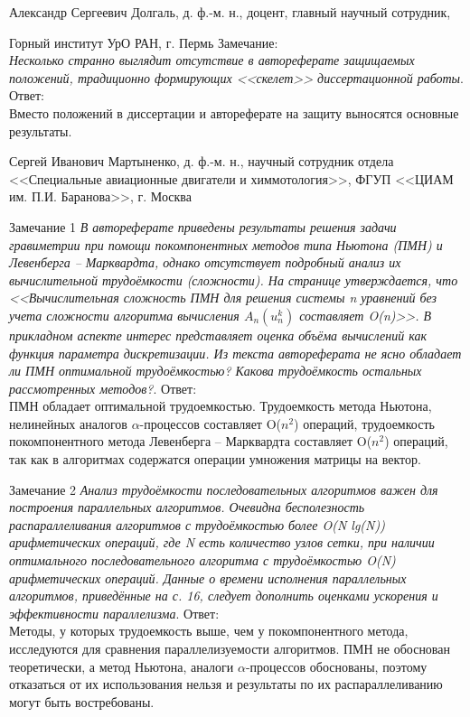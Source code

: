 \documentclass[10pt,pdf, mathserif, hyperref={unicode}]{beamer}
\begin{document}
\begin{frame}
	Александр Сергеевич Долгаль, д. ф.-м. н., доцент, главный научный сотрудник,
	
	\vskip 5mm
	Горный институт УрО РАН, г. Пермь
	\vskip 5mm
	Замечание:\\
	\textit{Несколько странно выглядит отсутствие в автореферате защищаемых положений, традиционно формирующих <<скелет>> диссертационной работы}.
	\vskip 5mm
	Ответ:\\
	Вместо положений в диссертации и автореферате на защиту выносятся основные результаты.
\end{frame}

\begin{frame}
	Сергей Иванович Мартыненко,  д. ф.-м. н., научный сотрудник отдела <<Специальные авиационные двигатели и химмотология>>,
	\vskip 5mm
	ФГУП <<ЦИАМ им. П.И. Баранова>>, г. Москва
\end{frame}

\begin{frame}{Замечание 1}
	\scriptsize
	\textit{В автореферате приведены результаты решения задачи гравиметрии при помощи покомпонентных методов типа Ньютона (ПМН) и Левенберга -- Марквардта, однако отсутствует подробный анализ их вычислительной трудоёмкости (сложности). На странице утверждается, что <<Вычислительная сложность ПМН для решения системы n уравнений без учета сложности алгоритма вычисления $A_n(u_n^k)$  составляет O(n)>>. В прикладном аспекте интерес представляет оценка объёма вычислений как функция параметра дискретизации. Из текста автореферата не ясно обладает ли ПМН оптимальной трудоёмкостью? Какова трудоёмкость остальных рассмотренных методов?}.
	\vskip 5mm
	Ответ:\\
	ПМН обладает оптимальной трудоемкостью. Трудоемкость метода Ньютона, нелинейных аналогов $\alpha$-процессов составляет O($n^2$) операций, трудоемкость покомпонентного метода Левенберга -- Марквардта составляет O($n^2$) операций, так как в алгоритмах содержатся операции умножения матрицы на вектор.
\end{frame}

\begin{frame}{Замечание 2}
	\scriptsize
	\textit{Анализ трудоёмкости последовательных алгоритмов важен для построения параллельных алгоритмов. Очевидна бесполезность распараллеливания алгоритмов с трудоёмкостью более O(N lg(N)) арифметических операций, где N есть количество узлов сетки, при наличии оптимального последовательного алгоритма с трудоёмкостью O(N) арифметических операций. Данные о времени исполнения параллельных алгоритмов, приведённые на с. 16, следует дополнить оценками ускорения и эффективности параллелизма}.
	\vskip 5mm
	Ответ:\\
	Методы, у которых трудоемкость выше, чем у покомпонентного метода, исследуются для сравнения параллелизуемости алгоритмов. ПМН не обоснован теоретически, а метод Ньютона, аналоги $\alpha$-процессов обоснованы, поэтому отказаться от их использования нельзя и результаты по их распараллеливанию могут быть востребованы.
\end{frame}
\end{document}

